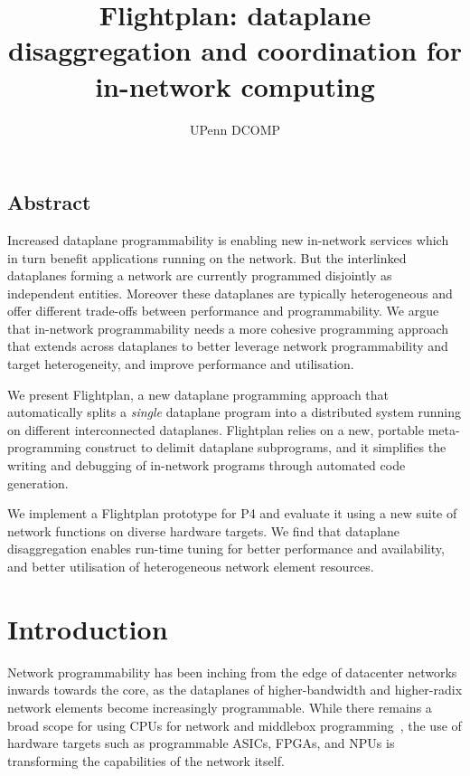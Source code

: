 \documentclass[letterpaper,twocolumn,10pt]{article}
\begin{document}
\date{}

\title{\Large \bf Flightplan: dataplane disaggregation and coordination for in-network computing}

\author{UPenn DCOMP}

\maketitle

\thispagestyle{empty}

\subsection*{Abstract}
Increased dataplane programmability is enabling new in-network services which
in turn benefit applications running on the network. But the interlinked
dataplanes forming a network are currently programmed disjointly as independent
entities.  Moreover these dataplanes are typically heterogeneous and offer
different trade-offs between performance and programmability.
We argue that in-network programmability needs a more cohesive
programming approach that extends across dataplanes to better leverage
network programmability and target heterogeneity, and improve
performance and utilisation.

We present Flightplan, a new dataplane programming approach that automatically
splits a \emph{single} dataplane program into a distributed system running on
different interconnected dataplanes.
Flightplan relies on a new, portable meta-programming construct to
delimit dataplane subprograms, and it simplifies the writing and
debugging of in-network programs through automated code generation.

We implement a Flightplan prototype for P4 and evaluate it using
a new suite of network functions on diverse hardware targets.
We find that dataplane disaggregation enables run-time tuning for
better performance and availability, and better utilisation of
heterogeneous network element resources.


\section{Introduction}
Network programmability has been inching from the edge of datacenter networks inwards
towards the core, as the dataplanes of higher-bandwidth and higher-radix
network elements become increasingly programmable. While there remains a broad
scope for using CPUs for network and middlebox programming~\cite{Fall:2011:REG:1945023.1945037,Laufer:2016:CEN:3027947.3027951,Bezahaf:2013:FFP:2535828.2535836,196178,Ballani:2015:EEN:2829988.2787493},
the use of hardware targets such as programmable ASICs, FPGAs, and
NPUs is transforming the capabilities of the network itself.
\end{document}
